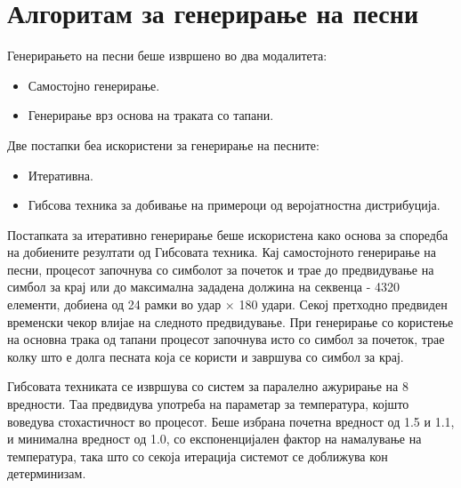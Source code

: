 \section{Алгоритам за генерирање на песни}

Генерирањето на песни беше извршено во два модалитета: 
\begin{itemize}
    \item Самостојно генерирање.
    \item Генерирање врз основа на траката со тапани.
\end{itemize}

Две постапки беа искористени за генерирање на песните: 
\begin{itemize}
    \item Итеративна.
    \item Гибсова техника за добивање на примероци од веројатностна дистрибуција.
\end{itemize}

Постапката за итеративно генерирање беше искористена како основа за споредба на добиените резултати од Гибсовата техника. Кај самостојното генерирање на песни, процесот започнува со симболот за почеток и трае до предвидување на симбол за крај или до максимална зададена должина на секвенца - 4320 елементи, добиена од 24 рамки во удар × 180 удари. Секој претходно предвиден временски чекор влијае на следното предвидување. При генерирање со користење на основна трака од тапани процесот започнува исто со симбол за почеток, трае колку што е долга песната која се користи и завршува со симбол за крај.

Гибсовата техниката се извршува со систем за паралелно ажурирање на 8 вредности. Таа предвидува употреба на параметар за температура, којшто воведува стохастичност во процесот. Беше избрана почетна вредност од 1.5 и 1.1, и минимална вредност од 1.0, со експоненцијален фактор на намалување на температура, така што со секоја итерација системот се доближува кон детерминизам.

